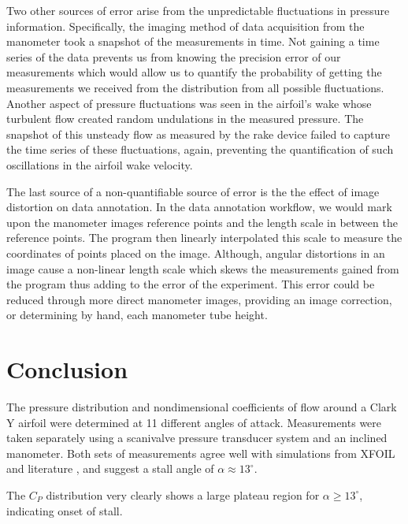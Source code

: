 \documentclass[runningheads]{llncs}
\begin{document}
\noindent
Two other sources of error arise from the unpredictable fluctuations in pressure information. Specifically, the imaging method of data acquisition from the manometer took a snapshot of the measurements in time. Not gaining a time series of the data prevents us from knowing the precision error of our measurements which would allow us to quantify the probability of getting the measurements we received from the distribution from all possible fluctuations. Another aspect of pressure fluctuations was seen in the airfoil's wake whose turbulent flow created random undulations in the measured pressure. The snapshot of this unsteady flow as measured by the rake device failed to capture the time series of these fluctuations, again, preventing the quantification of such oscillations in the airfoil wake velocity.\newline

\noindent
The last source of a non-quantifiable source of error is the the effect of image distortion on data annotation. In the data annotation workflow, we would mark upon the manometer images reference points and the length scale in between the reference points. The program then linearly interpolated this scale to measure the coordinates of points placed on the image. Although, angular distortions in an image cause a non-linear length scale which skews the measurements gained from the program thus adding to the error of the experiment. This error could be reduced through more direct manometer images, providing an image correction, or determining by hand, each manometer tube height.




\section{Conclusion}
The pressure distribution and nondimensional coefficients of flow around a Clark Y airfoil were determined at 11 different angles of attack. Measurements were taken separately using a scanivalve pressure transducer system and an inclined manometer. Both sets of measurements agree well with simulations from XFOIL and literature \cite{lyon_broeren_giguere_gopalarathnam_selig_1997}, and suggest a stall angle of $\alpha \approx 13^\circ$.

\noindent
The $C_P$ distribution very clearly shows a large plateau region for $\alpha \ge 13^\circ$, indicating onset of stall.
\end{document}
